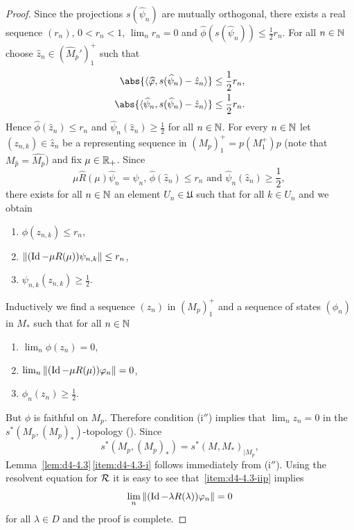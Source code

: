 \begin{proof}
Since the projections $ s(\widehat{\psi}_{n}) $  are mutually orthogonal, there exists a real sequence $ (r_{n}) $, $ 0 < r_{n} < 1 $, $ \lim_{n} r_{n} = 0 $  and $ \widehat{\phi}(s(\widehat{\psi}_{n})) \leq \frac{1}{2}r_{n} $.
For all $ n \in \mathbb{N} $  choose $ \hat{z}_{n} \in (\widehat{M}_{p}')_{1}^{+} $  such that
\begin{align*}
\abs{\langle\widehat{\phi},s(\widehat{\psi}_{n}) - \hat{z}_{n}\rangle} &\leq \frac{1}{2}r_{n}, \\
\abs{\langle\widehat{\psi}_{n},s(\widehat{\psi}_{n}) - \hat{z}_{n}\rangle} &\leq \frac{1}{2}r_{n}.
\end{align*}
Hence $ \widehat{\phi}(\hat{z}_{n}) \leq r_{n} $  and $ \widehat{\psi}_{n}(\hat{z}_{n}) \geq \frac{1}{2} $  for all $ n \in \mathbb{N} $.
For every $ n \in \mathbb{N} $  let $ (z_{n,k}) \in \hat{z}_{n} $  be a representing sequence in $ (M_{p})_{1}^{+} = p(M_{1}^{+})p $  (note that $ {M}_{\widehat{p}} = \widehat{M_{p}} $) and fix $ \mu \in \mathbb{R}_{+} $.
Since 
\[
\text{$\mu \widehat{R}(\mu)\widehat{\psi}_{n} = \widehat{\psi}_{n}$, 
$\widehat{\phi}(\hat{z}_{n}) \leq r_{n}$ and 
$\widehat{\psi}_{n}(\hat{z}_{n}) \geq \frac{1}{2}$, }
\]
there exists for all $ n \in \mathbb{N} $  an element $ U_{n} \in \mathfrak{U} $  such that for all $ k \in U_{n} $ and we obtain
\begin{enumerate}[label=(\roman*$^{\prime}$), wide, labelindent=3em]
\item
$ \phi(z_{n,k}) \leq r_{n} $,

\item
$ \|(\Id - \mu R(\mu))\psi_{n,k}\| \leq r_{n} $,

\item
$ \psi_{n,k}(z_{n,k}) \geq \frac{1}{2} $. 
\end{enumerate}
Inductively we find a sequence $ (z_{n}) $  in $ (M_{p})_{1}^{+} $  and a sequence of states $ (\phi_{n}) $  in $ M_{*} $  such that for all $ n \in \mathbb{N} $ 
\begin{enumerate}[label=(\roman*$^{\prime\prime}$), wide, labelindent=3em]
\item
$ \lim_{n} \phi(z_{n}) = 0 $, 

\item\label{item:d4-4.3-iip}
$ \lim_{n} \|(\Id - \mu R(\mu))\phi_{n}\| = 0 $, 

\item
$ \phi_{n}(z_{n}) \geq \frac{1}{2} $.
\end{enumerate}
But $ \phi $  is faithful on $ M_{p} $.
Therefore condition (i$''$) implies that $ \lim_{n} z_{n} = 0 $  in the $ s^{*}(M_{p},(M_{p})_{*}) $-topology (\textcite[Proposition III.5.4]{takesaki:1979}).
Since 
%
\[
	s^{*}(M_{p},(M_{p})_{*}) = s^{*}(M,M_{*})_{\vert M_{p}} ,
\]
%
Lemma~\ref{lem:d4-4.3}\,\ref{item:d4-4.3-i} follows immediately from (i$''$).
Using the resolvent equation for $ \mathcal{R} $  it is easy to see that~\ref{item:d4-4.3-iip} implies
\[
\lim_{n} \|(\Id - \lambda R(\lambda))\phi_{n}\| = 0
\]
for all $ \lambda \in D $  and the proof is complete.
\end{proof}
